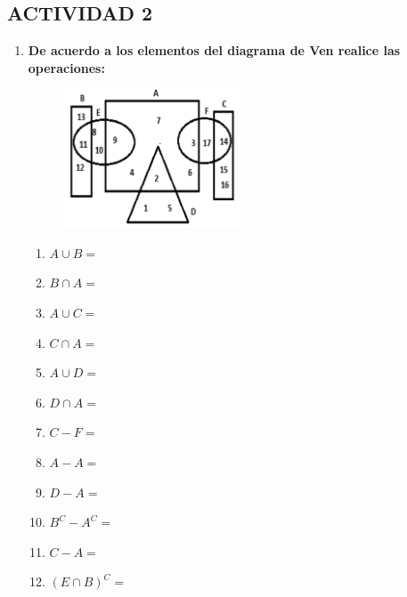 \documentclass[12pt]{article}
\begin{document}
            \subsection*{\textbf{\centering ACTIVIDAD 2}}

            \begin{enumerate}
                \item \textbf{De acuerdo a los elementos del diagrama de Ven realice las operaciones:}
                    \begin{figure}[!h]
                        \centering
                        \includegraphics[width=0.5\textwidth]{Img/Tarea2/DiagVennActividad2.png}
                    \end{figure}

                    \begin{enumerate}
                        \item $A \cup B =$
                        \item $B \cap A =$
                        \item $A \cup C =$
                        \item $C \cap A =$
                        \item $A \cup D =$
                        \item $D \cap A =$
                        \item $C - F =$
                        \item $A - A =$
                        \item $D - A =$
                        \item $B^C - A^C =$
                        \item $C - A =$
                        \item $(E \cap B)^C = $
                    \end{enumerate}
            \end{enumerate}
\end{document}
